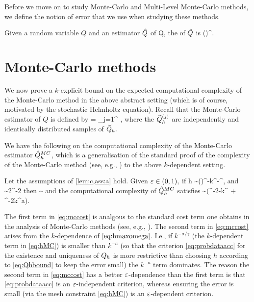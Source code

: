 Before we move on to study Monte-Carlo and Multi-Level Monte-Carlo methods, we define the notion of error that we use when studying these methods.

\label{def:rmse}
Given a random variable $Q$ and an estimator $\hat{Q}$ of Q, the  of $\hat{Q}$ is
\beqs
\err{\Qhat} \de \mleft(\mright)^{\half}.
\eeqs
\ede

\section{Monte-Carlo methods}\label{sec:mc}

We now prove a $k$-explicit bound on the expected computational complexity of the Monte-Carlo method in the above abstract setting (which is of course, motivated by the stochastic Helmholtz equation). Recall that the Monte-Carlo estimator of $Q$ is defined by
\beqs
\QhatMC =  \sum_{j=1}^{\NMC} \Qhtildesj,
\eeqs
where the $\widetilde{Q}_{h}^{(j)}$ are independently and identically distributed samples of $\widetilde{Q}_{h}.$

We have the following  on the computational complexity of the Monte-Carlo estimator $\hat{Q}^{MC}_{h}$, which is a generalisation of the standard proof of the complexity of the Monte-Carlo method (see, e.g., \cite[Section 2.1]{ClGiScTe:11}) to the above $k$-dependent setting.

\label{thm:hhmc}
Let the assumptions of \cref{lem:c,ass:a} hold. Given $\varepsilon \in (0,1),$ if
\beq\label{eq:hMC}
h \sim \mleft(\co\mright)^{-}k^{-\frac\sigma\alpha}\eps^{},
\eeq
and
\beq\label{eq:NMC}
\NMC  \sim 2\VAR{\Qhtilde}\eps^{-2}
\eeq
then
\beq\label{eq:mcerror}
\err{\QhatMC} \sim \eps
\eeq
and the computational complexity of $\hat{Q}^{MC}_{h}$ satisfies
\beq\label{eq:mccost}
\EXP{\CMC} \sim \VAR{\Qhtilde}\mleft(\eps^{-2-\frac{\gamma}{\alpha}}k^{\frac{\gamma\sigma}\alpha} + \eps^{-2}k^{a\gamma}\mright).
\eeq
\enth

The first term in \cref{eq:mccost} is analgous to the standard cost term one obtains in the analysis of Monte-Carlo methods (see, e.g., \cite[Section 2.1]{ClGiScTe:11}). The second term in \cref{eq:mccost} arises from the $k$-dependence of $\cref{eq:hmaxomega}$. I.e., if $k^{-\sigma/\gamma}$ (the $k$-dependent term in \cref{eq:hMC}) is smaller than $k^{-a}$ (so that the criterion \cref{eq:probdataacc} for the existence and uniqueness of $Q_{h}$ is more restrictive than choosing $h$ according to \cref{eq:Qhbound} to keep the error small) the $k^{-a}$ term dominates. The reason the second term in \cref{eq:mccost} has a better $\varepsilon$-dependence than the first term is that \cref{eq:probdataacc} is an $\varepsilon$-independent criterion, whereas ensuring the error is small (via the mesh constraint \cref{eq:hMC}) is an $\varepsilon$-dependent criterion.

